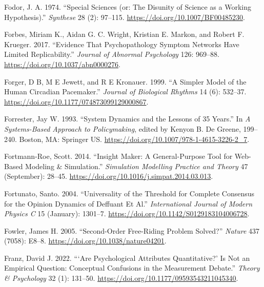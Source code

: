 \documentclass[
  a4paper,
  DIV=11,
  numbers=noendperiod]{scrreprt}
\newlength{\cslhangindent}
\newlength{\cslentryspacingunit} %
\newenvironment{CSLReferences}[2] %
 {%
  \setlength{\parindent}{0pt}
  \ifodd #1
  \let\oldpar\par
  \def\par{\hangindent=\cslhangindent\oldpar}
  \fi
  \setlength{\parskip}{#2\cslentryspacingunit}
 }%
 {}
\begin{document}
\begin{CSLReferences}{1}{0}
\leavevmode{}%
Fodor, J. A. 1974. {``Special Sciences (or: {The} Disunity of Science as
a Working Hypothesis).''} \emph{Synthese} 28 (2): 97--115.
\url{https://doi.org/10.1007/BF00485230}.

\leavevmode{}%
Forbes, Miriam K., Aidan G. C. Wright, Kristian E. Markon, and Robert F.
Krueger. 2017. {``Evidence That Psychopathology Symptom Networks Have
Limited Replicability.''} \emph{Journal of Abnormal Psychology} 126:
969--88. \url{https://doi.org/10.1037/abn0000276}.

\leavevmode{}%
Forger, D B, M E Jewett, and R E Kronauer. 1999. {``A Simpler Model of
the Human Circadian Pacemaker.''} \emph{Journal of Biological Rhythms}
14 (6): 532--37. \url{https://doi.org/10.1177/074873099129000867}.

\leavevmode{}%
Forrester, Jay W. 1993. {``System {Dynamics} and the {Lessons} of 35
{Years}.''} In \emph{A {Systems-Based Approach} to {Policymaking}},
edited by Kenyon B. De Greene, 199--240. {Boston, MA}: {Springer US}.
\url{https://doi.org/10.1007/978-1-4615-3226-2_7}.

\leavevmode{}%
Fortmann-Roe, Scott. 2014. {``Insight {Maker}: {A} General-Purpose Tool
for Web-Based Modeling \& Simulation.''} \emph{Simulation Modelling
Practice and Theory} 47 (September): 28--45.
\url{https://doi.org/10.1016/j.simpat.2014.03.013}.

\leavevmode{}%
Fortunato, Santo. 2004. {``Universality of the {Threshold} for {Complete
Consensus} for the {Opinion Dynamics} of {Deffuant} Et Al.''}
\emph{International Journal of Modern Physics C} 15 (January): 1301--7.
\url{https://doi.org/10.1142/S0129183104006728}.

\leavevmode{}%
Fowler, James H. 2005. {``Second-Order Free-Riding Problem Solved?''}
\emph{Nature} 437 (7058): E8--8.
\url{https://doi.org/10.1038/nature04201}.

\leavevmode{}%
Franz, David J. 2022. {``{`{Are} Psychological Attributes
Quantitative?'} Is Not an Empirical Question: {Conceptual} Confusions in
the Measurement Debate.''} \emph{Theory \& Psychology} 32 (1): 131--50.
\url{https://doi.org/10.1177/09593543211045340}.


\end{CSLReferences}
\end{document}
